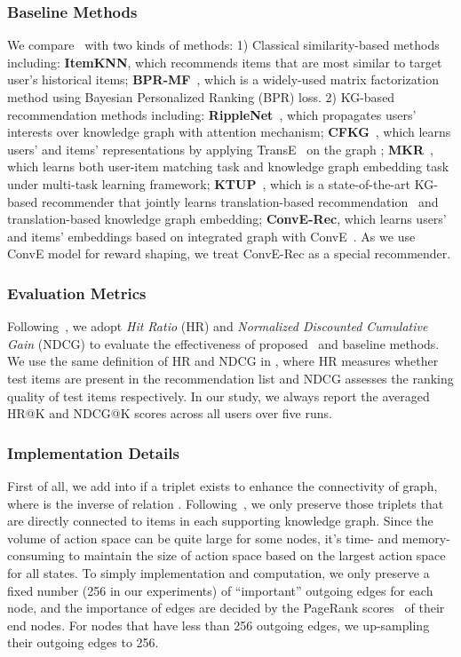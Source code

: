\subsubsection{Baseline Methods} 
We compare \name\ with two kinds of methods: 
1) Classical similarity-based methods including:  
\textbf{ItemKNN}, which recommends items that are most similar to target user's historical items; 
\textbf{BPR-MF}~\cite{yu2014personalized}, which is a widely-used matrix factorization method using Bayesian Personalized Ranking (BPR) loss. 
2) KG-based recommendation methods including: 
\textbf{RippleNet}~\cite{wang2018ripplenet}, which propagates users' interests over knowledge graph with attention mechanism;  
\textbf{CFKG}~\cite{zhang2018learning}, which learns users' and items' representations by applying TransE~\cite{bordes2013translating} on the graph ; 
\textbf{MKR}~\cite{Wang_2019}, which learns both user-item matching task and knowledge graph embedding task under multi-task learning framework; 
\textbf{KTUP}~\cite{Cao_2019}, which is a state-of-the-art KG-based recommender that jointly learns translation-based recommendation~\cite{he2017translation} and translation-based knowledge graph embedding;
\textbf{ConvE-Rec}, which learns users' and items' embeddings based on integrated graph  with ConvE~\cite{dettmers2018convolutional}. As we use ConvE model for reward shaping, we treat ConvE-Rec as a special recommender.  


\subsubsection{Evaluation Metrics} Following~\cite{Cao_2019,he2015trirank,song2019session}, we adopt \textit{Hit Ratio} (HR) and \textit{Normalized Discounted Cumulative Gain} (NDCG) to evaluate the effectiveness of proposed \name\ and baseline methods. We use the same definition of HR and NDCG in \cite{he2015trirank}, where HR measures whether test items are present in the recommendation list and NDCG assesses the ranking quality of test items respectively.
In our study, we always report the averaged HR@K and NDCG@K scores across all users over five runs.



\subsubsection{Implementation Details} First of all, we add  into  if a triplet  exists to enhance the connectivity of graph, where  is the inverse of relation .
Following~\cite{Cao_2019}, we only preserve those triplets that are directly connected to items in each supporting knowledge graph.
Since the volume of action space  can be quite large for some nodes, it's time- and memory-consuming to maintain the size of action space based on the largest action space for all states. To simply implementation and computation, we only preserve a fixed number (256 in our experiments) of ``important'' outgoing edges for each node, and the importance of edges are decided by the PageRank scores~\cite{Pageetal98} of their end nodes. For nodes that have less than 256 outgoing edges, we up-sampling their outgoing edges to 256. 

